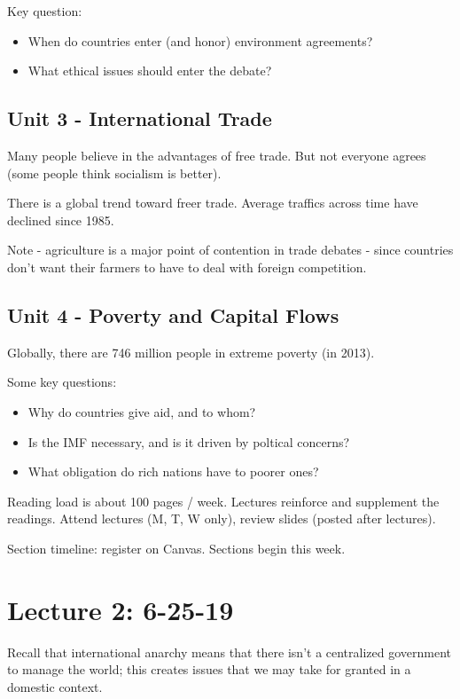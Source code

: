 \documentclass{article}
\begin{document}
Key question:
\begin{itemize}
  \item When do countries enter (and honor) environment agreements?
  \item What ethical issues should enter the debate?
\end{itemize}

\subsection{Unit 3 - International Trade}

Many people believe in the advantages of free trade.  But not everyone agrees (some people think socialism is better).

There is a global trend toward freer trade.  Average traffics across time have declined since 1985.

Note - agriculture is a major point of contention in trade debates - since countries don't want their farmers to have to deal with foreign competition.

\subsection{Unit 4 - Poverty and Capital Flows}

Globally, there are 746 million people in extreme poverty (in 2013).

Some key questions:

\begin{itemize}
  \item Why do countries give aid, and to whom?
  \item Is the IMF necessary, and is it driven by poltical concerns?
  \item What obligation do rich nations have to poorer ones?
\end{itemize}

Reading load is about 100 pages / week.  Lectures reinforce and supplement the readings.  Attend lectures (M, T, W only), review slides (posted after lectures).

Section timeline: register on Canvas.  Sections begin this week.


\section{Lecture 2: 6-25-19}

Recall that international anarchy means that there isn't a centralized government to manage the world; this creates issues that we may take for granted in a domestic context.
\end{document}
